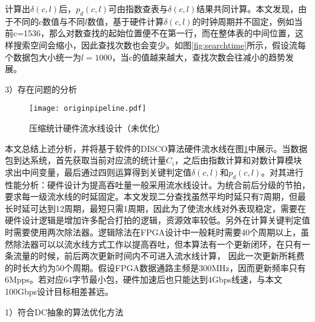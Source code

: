 
计算出$ \delta(c,l)$后，$p_d(c,l) $可由指数查表与$ \delta(c,l)$结果共同计算。本文发现，由于不同的$ c $数值与不同$ l $数值，基于硬件计算$ \delta(c,l)$的时钟周期并不固定，例如当前c=1536，那么对数查找的起始位置便不在第一行，而在整体表的中间位置，这样搜索空间会缩小，因此查找次数也会变少。如图\ref{fig:searchtime}所示，假设流每个数据包大小统一为$ l=1000 $，当c的值越来越大，查找次数会往减小的趋势发展。




3）存在问题的分析

\begin{figure}[!ht]
	\centering 
	\vspace{-1.5mm}
	\texttt{[image: originpipeline.pdf]}
	\caption{压缩统计硬件流水线设计（未优化）} \label{fig:originpipeline}
\end{figure}

本文总结上述分析，并将基于软件的DISCO算法硬件流水线在图\ref{fig:originpipeline}中展示。当数据包到达系统，首先获取当前对应流的统计量$ C_i $，之后由指数计算和对数计算模块求出中间变量，最后通过四则运算得到关键判定值$ \delta(c,l)$和$p_d(c,l) $。对其进行性能分析：硬件设计为提高吞吐量一般采用流水线设计。为统合前后分级的节拍，要求每一级流水线的时延固定。本文发现二分查找虽然平均时延只有7周期，但最长时延可达到12周期，最短只需1周期，因此为了使流水线对外表现稳定，需要在硬件设计逻辑是增加许多配合打拍的逻辑，资源效率较低。另外在计算关键判定值时需要使用两次除法器。逻辑除法在FPGA设计中一般耗时需要40个周期以上，虽然除法器可以以流水线方式工作以提高吞吐，但本算法有一个更新闭环，在只有一条流量的时候，前后两次更新时间内不可进入流水线计算，
因此一次更新所耗费的时长大约为50个周期。假设FPGA数据通路主频是300MHz，因而更新频率只有6Mpps。若对应64字节最小包，硬件加速后也只能达到4Gbps线速，与本文100Gbps设计目标相差甚远。

\label{chap354}

1）符合DC抽象的算法优化方法

